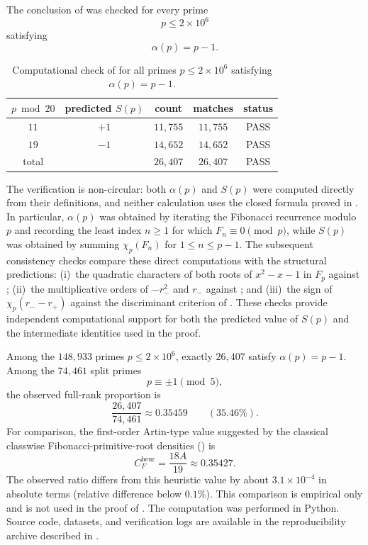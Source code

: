 \documentclass[preprint,12pt]{elsarticle}
\def\F{F}%
\numberwithin{equation}{section}
\theoremstyle{plain}
\theoremstyle{definition}
\newcommand{\F}{\mathbb{F}}
\begin{document}
The conclusion of  was checked for every prime
\[
p\le2\times10^6
\]
satisfying
\[
\alpha(p)=p-1.
\]
 
\begin{table}[ht]
\centering
\caption{Computational check of  for all primes
$p\le2\times10^6$ satisfying $\alpha(p)=p-1$.}
\label{tab:verification}
\small
\begin{tabular}{@{}ccccc@{}}
\toprule
$p\bmod 20$ & predicted $S(p)$ & count & matches & status\\
\midrule
$11$ & $+1$ & $11{,}755$ & $11{,}755$ & PASS\\
$19$ & $-1$ & $14{,}652$ & $14{,}652$ & PASS\\
\midrule
total & & $26{,}407$ & $26{,}407$ & PASS\\
\bottomrule
\end{tabular}
\end{table}
 
The verification is non-circular: both $\alpha(p)$ and $S(p)$
were computed directly from their definitions, and neither
calculation uses the closed formula proved in .
In particular, $\alpha(p)$ was obtained by iterating the Fibonacci
recurrence modulo $p$ and recording the least index $n\ge1$ for which
$F_n\equiv0\pmod p$, while $S(p)$ was obtained by summing
$\chi_p(F_n)$ for $1\le n\le p-1$. The subsequent consistency checks
compare these
direct computations with the structural predictions: (i)~the
quadratic characters of both roots of $x^2-x-1$ in $\F_p$ against
; (ii)~the multiplicative orders of
$-r_-^2$ and $r_-$ against
; and (iii)~the sign
of $\chi_p(r_--r_+)$ against the discriminant criterion of
. These checks provide independent
computational support for both the predicted value of $S(p)$ and
the intermediate identities used in the proof.
 
Among the $148{,}933$ primes $p\le2\times10^6$, exactly $26{,}407$
satisfy $\alpha(p)=p-1$. Among the $74{,}461$ split primes
\[
p\equiv\pm1\pmod5,
\]
the observed full-rank proportion is
\[
\frac{26{,}407}{74{,}461}\approx0.35459
\qquad(35.46\%).
\]
For comparison, the first-order Artin-type value suggested by the
classical classwise Fibonacci-primitive-root densities
() is
\[
C_F^{\mathrm{heur}}=\frac{18A}{19}\approx0.35427.
\]
The observed ratio differs from this heuristic value by about
$3.1\times10^{-4}$ in absolute terms (relative difference below
$0.1\%$). This comparison is empirical only and is not used in the
proof of . The computation was performed in Python.
Source code, datasets, and verification logs are available in the
reproducibility archive described in .
 
\end{document}
